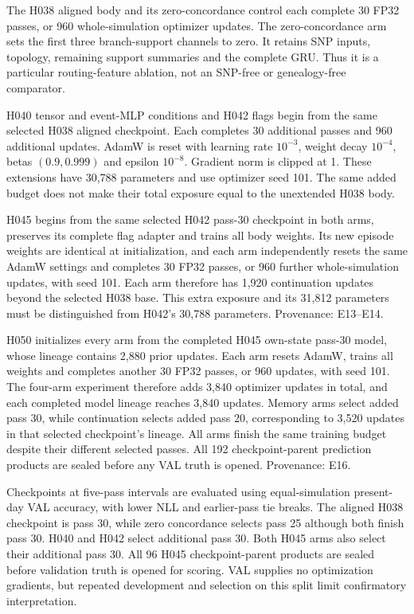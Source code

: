 \documentclass[letterpaper]{article}
\begin{document}
The H038 aligned body and its zero-concordance control each complete 30 FP32 passes, or 960 whole-simulation optimizer updates. The zero-concordance arm sets the first three branch-support channels to zero. It retains SNP inputs, topology, remaining support summaries and the complete GRU. Thus it is a particular routing-feature ablation, not an SNP-free or genealogy-free comparator.

H040 tensor and event-MLP conditions and H042 flags begin from the same selected H038 aligned checkpoint. Each completes 30 additional passes and 960 additional updates. AdamW is reset with learning rate $10^{-3}$, weight decay $10^{-4}$, betas $(0.9,0.999)$ and epsilon $10^{-8}$. Gradient norm is clipped at 1. These extensions have 30,788 parameters and use optimizer seed 101. The same added budget does not make their total exposure equal to the unextended H038 body.

H045 begins from the same selected H042 pass-30 checkpoint in both arms, preserves its complete flag adapter and trains all body weights. Its new episode weights are identical at initialization, and each arm independently resets the same AdamW settings and completes 30 FP32 passes, or 960 further whole-simulation updates, with seed 101. Each arm therefore has 1,920 continuation updates beyond the selected H038 base. This extra exposure and its 31,812 parameters must be distinguished from H042's 30,788 parameters. Provenance: E13--E14.

H050 initializes every arm from the completed H045 own-state pass-30 model, whose lineage contains 2,880 prior updates. Each arm resets AdamW, trains all weights and completes another 30 FP32 passes, or 960 updates, with seed 101. The four-arm experiment therefore adds 3,840 optimizer updates in total, and each completed model lineage reaches 3,840 updates. Memory arms select added pass 30, while continuation selects added pass 20, corresponding to 3,520 updates in that selected checkpoint's lineage. All arms finish the same training budget despite their different selected passes. All 192 checkpoint-parent prediction products are sealed before any VAL truth is opened. Provenance: E16.

Checkpoints at five-pass intervals are evaluated using equal-simulation present-day VAL accuracy, with lower NLL and earlier-pass tie breaks. The aligned H038 checkpoint is pass 30, while zero concordance selects pass 25 although both finish pass 30. H040 and H042 select additional pass 30. Both H045 arms also select their additional pass 30. All 96 H045 checkpoint-parent products are sealed before validation truth is opened for scoring. VAL supplies no optimization gradients, but repeated development and selection on this split limit confirmatory interpretation.
\end{document}
